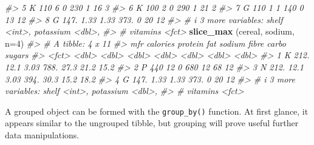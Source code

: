 \documentclass[
]{book}
\newenvironment{Shaded}{\begin{snugshade}}{\end{snugshade}}
\newcommand{\AttributeTok}[1]{\textcolor[rgb]{0.13,0.29,0.53}{#1}}
\newcommand{\CommentTok}[1]{\textcolor[rgb]{0.56,0.35,0.01}{\textit{#1}}}
\newcommand{\DecValTok}[1]{\textcolor[rgb]{0.00,0.00,0.81}{#1}}
\newcommand{\FunctionTok}[1]{\textcolor[rgb]{0.13,0.29,0.53}{\textbf{#1}}}
\newcommand{\NormalTok}[1]{#1}
\begin{document}
\begin{Shaded}
\begin{Highlighting}[]
\CommentTok{\#\textgreater{} 5 K         110     6     0      230   1     16        3}
\CommentTok{\#\textgreater{} 6 K         100     2     0      290   1     21        2}
\CommentTok{\#\textgreater{} 7 G         110     1     1      140   0     13       12}
\CommentTok{\#\textgreater{} 8 G         147.    1.33  1.33   373.  0     20       12}
\CommentTok{\#\textgreater{} \# i 3 more variables: shelf \textless{}int\textgreater{}, potassium \textless{}dbl\textgreater{},}
\CommentTok{\#\textgreater{} \#   vitamins \textless{}fct\textgreater{}}
\FunctionTok{slice\_max}\NormalTok{ (cereal, sodium, }\AttributeTok{n=}\DecValTok{4}\NormalTok{)}
\CommentTok{\#\textgreater{} \# A tibble: 4 x 11}
\CommentTok{\#\textgreater{}   mfr   calories protein   fat sodium fibre carbo sugars}
\CommentTok{\#\textgreater{}   \textless{}fct\textgreater{}    \textless{}dbl\textgreater{}   \textless{}dbl\textgreater{} \textless{}dbl\textgreater{}  \textless{}dbl\textgreater{} \textless{}dbl\textgreater{} \textless{}dbl\textgreater{}  \textless{}dbl\textgreater{}}
\CommentTok{\#\textgreater{} 1 K         212.   12.1   3.03   788.  27.3  21.2   15.2}
\CommentTok{\#\textgreater{} 2 P         440    12     0      680   12    68     12  }
\CommentTok{\#\textgreater{} 3 N         212.   12.1   3.03   394.  30.3  15.2   18.2}
\CommentTok{\#\textgreater{} 4 G         147.    1.33  1.33   373.   0    20     12  }
\CommentTok{\#\textgreater{} \# i 3 more variables: shelf \textless{}int\textgreater{}, potassium \textless{}dbl\textgreater{},}
\CommentTok{\#\textgreater{} \#   vitamins \textless{}fct\textgreater{}}
\end{Highlighting}
\end{Shaded}

A grouped object can be formed with the \texttt{group\_by()} function. At first glance, it appears similar to the ungrouped tibble, but grouping will prove useful further data manipulations.
\end{document}
